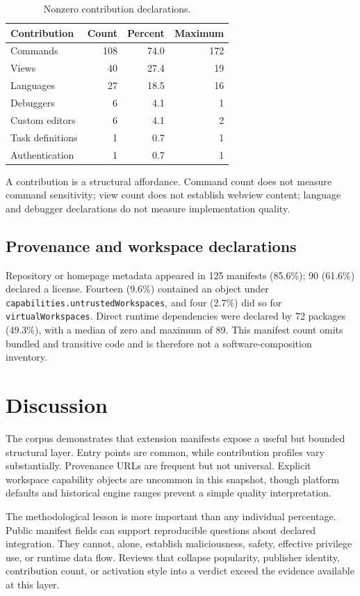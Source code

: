 \documentclass[10pt,twocolumn]{article}
\newcommand{\pct}[1]{#1\%}
\begin{document}
\begin{table}[t]
\centering
\caption{Nonzero contribution declarations.}
\label{tab:contrib}
\begin{tabular}{lrrr}
\toprule
Contribution & Count & Percent & Maximum \\
\midrule
Commands & 108 & 74.0 & 172 \\
Views & 40 & 27.4 & 19 \\
Languages & 27 & 18.5 & 16 \\
Debuggers & 6 & 4.1 & 1 \\
Custom editors & 6 & 4.1 & 2 \\
Task definitions & 1 & 0.7 & 1 \\
Authentication & 1 & 0.7 & 1 \\
\bottomrule
\end{tabular}
\end{table}

A contribution is a structural affordance. Command count does not measure command sensitivity; view count does not establish webview content; language and debugger declarations do not measure implementation quality.

\subsection{Provenance and workspace declarations}
Repository or homepage metadata appeared in 125 manifests (\pct{85.6}); 90 (\pct{61.6}) declared a license. Fourteen (\pct{9.6}) contained an object under \texttt{capabilities.untrustedWorkspaces}, and four (\pct{2.7}) did so for \texttt{virtualWorkspaces}. Direct runtime dependencies were declared by 72 packages (\pct{49.3}), with a median of zero and maximum of 89. This manifest count omits bundled and transitive code and is therefore not a software-composition inventory.

\section{Discussion}
The corpus demonstrates that extension manifests expose a useful but bounded structural layer. Entry points are common, while contribution profiles vary substantially. Provenance URLs are frequent but not universal. Explicit workspace capability objects are uncommon in this snapshot, though platform defaults and historical engine ranges prevent a simple quality interpretation.

The methodological lesson is more important than any individual percentage. Public manifest fields can support reproducible questions about declared integration. They cannot, alone, establish maliciousness, safety, effective privilege use, or runtime data flow. Reviews that collapse popularity, publisher identity, contribution count, or activation style into a verdict exceed the evidence available at this layer.
\end{document}
